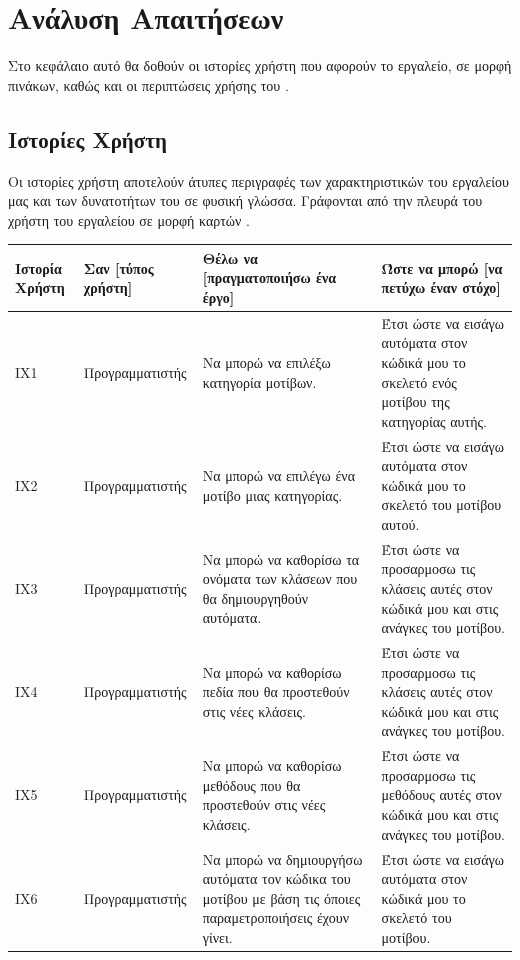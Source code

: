 \chapter{Ανάλυση Απαιτήσεων}
Στο κεφάλαιο αυτό θα δοθούν οι ιστορίες χρήστη \cite{SWEBOK} που αφορούν το εργαλείο, σε μορφή πινάκων, καθώς  και οι περιπτώσεις χρήσης του \cite{SWEBOK}.

\label{ch:requirmentAnalysis}
\section{Ιστορίες Χρήστη}
\label{sec:userStories}
Οι ιστορίες χρήστη αποτελούν άτυπες περιγραφές  των χαρακτηριστικών του εργαλείου μας και των δυνατοτήτων του σε φυσική γλώσσα. 
Γράφονται από την πλευρά του χρήστη του εργαλείου σε μορφή καρτών \cite{SWEBOK}.
\begin{table}[H]
	\hspace*{-0.2cm}
    \centering
    \scriptsize
	\begin{tabular}{|p{1.5cm}|p{3.5cm}|p{4.5cm}|p{4.7cm}|}
    \hline
        \textbf{Ιστορία Χρήστη} & \textbf{Σαν [τύπος χρήστη]} & \textbf{Θέλω να [πραγματοποιήσω ένα έργο]} & \textbf{Ώστε να μπορώ [να πετύχω έναν στόχο]} \\ \hline     \hline
        ΙΧ1 & Προγραμματιστής & Να μπορώ να επιλέξω κατηγορία μοτίβων. & Έτσι ώστε να εισάγω αυτόματα στον κώδικά μου το σκελετό ενός μοτίβου της κατηγορίας αυτής. \\ \hline
        ΙΧ2 & Προγραμματιστής & Να μπορώ να επιλέγω ένα μοτίβο μιας κατηγορίας. & Έτσι ώστε να  εισάγω αυτόματα στον κώδικά μου το σκελετό του μοτίβου αυτού. \\ \hline
        ΙΧ3 & Προγραμματιστής & Να μπορώ να καθορίσω τα ονόματα των κλάσεων που θα δημιουργηθούν αυτόματα. & Έτσι ώστε να προσαρμοσω τις κλάσεις αυτές στον κώδικά μου και στις ανάγκες του μοτίβου. \\ \hline
        ΙΧ4 & Προγραμματιστής & Να μπορώ να καθορίσω πεδία που θα προστεθούν στις νέες κλάσεις.  & Έτσι ώστε να προσαρμοσω τις κλάσεις αυτές στον κώδικά μου και στις ανάγκες του μοτίβου. \\ \hline
        ΙΧ5 & Προγραμματιστής & Να μπορώ να καθορίσω μεθόδους που θα προστεθούν στις νέες κλάσεις. & Έτσι ώστε να προσαρμοσω τις μεθόδους αυτές στον κώδικά μου και στις ανάγκες του μοτίβου. \\ \hline
        ΙΧ6 & Προγραμματιστής & Να μπορώ να δημιουργήσω αυτόματα τον κώδικα του μοτίβου με βάση τις όποιες παραμετροποιήσεις έχουν γίνει. & Έτσι ώστε να εισάγω αυτόματα στον κώδικά μου το σκελετό του μοτίβου. \\ \hline

\end{tabular}
\end{table}
